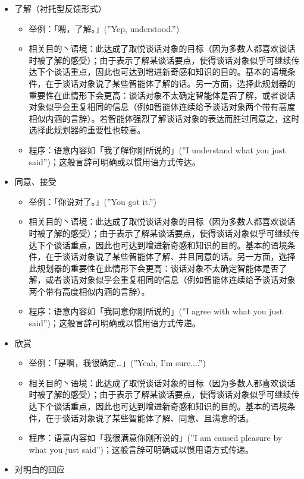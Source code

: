 \begin{itemize}
\item 了解（衬托型反馈形式）
\begin{itemize}
\item 举例：「嗯，了解。」(”Yep, understood.”)
\item 相关目的丶语境：此达成了取悦谈话对象的目标（因为多数人都喜欢谈话时被了解的感受）；由于表示了解某谈话要点，使得谈话对象似乎可继续传达下个谈话重点，因此也可达到增进新奇感和知识的目的。基本的语境条件，在于谈话对象说了某些智能体了解的话。另一方面，选择此规划器的重要性在此情形下会更高：谈话对象不太确定智能体是否了解，或者谈话对象似乎会重复相同的信息（例如智能体连续给予谈话对象两个带有高度相似内涵的言辞）。若智能体强烈了解谈话对象的表达而胜过同意之，这时选择此规划器的重要性也较高。
\item 程序：语意内容如「我了解你刚所说的」(”I understand what you just said”)；这般言辞可明确或以惯用语方式传达。
\end{itemize}
\item 同意、接受
\begin{itemize}
\item 举例：「你说对了。」(”You got it.”)
\item 相关目的丶语境：此达成了取悦谈话对象的目标（因为多数人都喜欢谈话时被了解的感受）；由于表示了解某谈话要点，使得谈话对象似乎可继续传达下个谈话重点，因此也可达到增进新奇感和知识的目的。基本的语境条件，在于谈话对象说了某些智能体了解、并且同意的话。另一方面，选择此规划器的重要性在此情形下会更高：谈话对象不太确定智能体是否了解，或者谈话对象似乎会重复相同的信息（例如智能体连续给予谈话对象两个带有高度相似内涵的言辞）。 
\item 程序：语意内容如「我同意你刚所说的」(”I agree with what you just said”)；这般言辞可明确或以惯用语方式传递。
\end{itemize}
\item 欣赏
\begin{itemize}
\item 举例：「是啊，我很确定…」(”Yeah, I’m sure....”)
\item 相关目的丶语境：此达成了取悦谈话对象的目标（因为多数人都喜欢谈话时被了解的感受）；由于表示了解某谈话要点，使得谈话对象似乎可继续传达下个谈话重点，因此也可达到增进新奇感和知识的目的。基本的语境条件，在于谈话对象说了某些智能体了解、同意、且满意的话。 
\item 程序：语意内容如「我很满意你刚所说的」(”I am caused pleasure by what you just said”)；这般言辞可明确或以惯用语方式传递。
\end{itemize}
\item 对明白的回应

\end{itemize}
